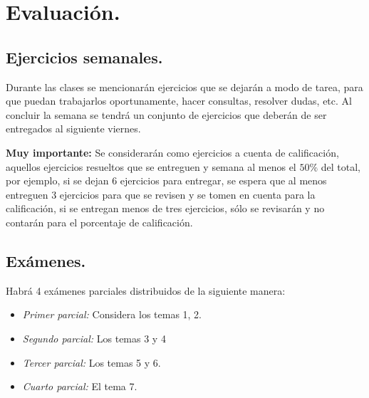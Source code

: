\documentclass[12pt]{article}
\begin{document}
\section{Evaluación.}
\subsection{Ejercicios semanales.}
Durante las clases se mencionarán ejercicios que se dejarán a modo de tarea, para que puedan trabajarlos oportunamente, hacer consultas, resolver dudas, etc. Al concluir la semana se tendrá un conjunto de ejercicios que deberán de ser entregados al siguiente viernes.

\textbf{Muy importante:} Se considerarán como ejercicios a cuenta de calificación, aquellos ejercicios resueltos que se entreguen y semana al menos el $50\%$ del total, por ejemplo, si se dejan 6 ejercicios para entregar, se espera que al menos entreguen 3 ejercicios para que se revisen y se tomen en cuenta para la calificación, si se entregan menos de tres ejercicios, sólo se revisarán y no contarán para el porcentaje de calificación.
\subsection{Exámenes.}
Habrá 4 exámenes parciales distribuidos de la siguiente manera:
\begin{itemize}
\item \emph{Primer parcial:} Considera los temas 1, 2.
\item \emph{Segundo parcial:} Los temas 3 y 4
\item \emph{Tercer parcial:} Los temas 5 y 6.
\item \emph{Cuarto parcial:} El tema 7.
\end{itemize}
\end{document}
